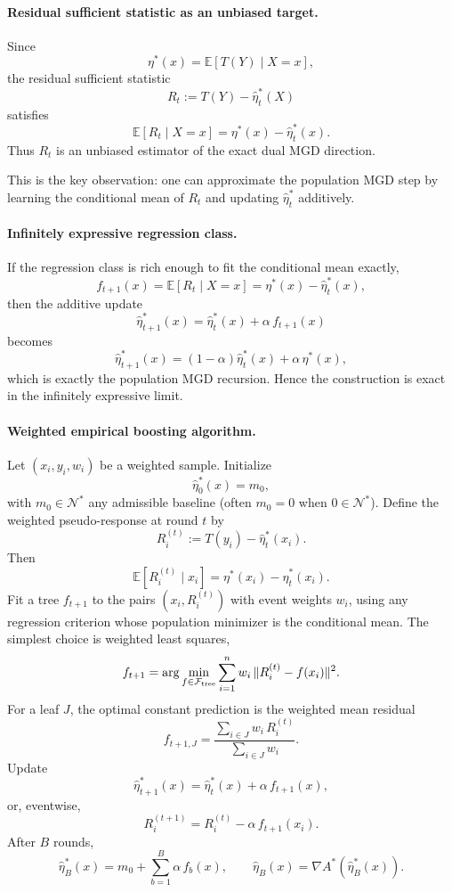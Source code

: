 \documentclass[11pt]{article}
\begin{document}
\paragraph{Residual sufficient statistic as an unbiased target.}
Since
\[
\eta^\ast(x)=\mathbb E[T(Y)\mid X=x],
\]
the residual sufficient statistic
\[
R_t:=T(Y)-\hat\eta_t^\ast(X)
\]
satisfies
\[
\mathbb E[R_t\mid X=x]
=
\eta^\ast(x)-\hat\eta_t^\ast(x).
\]
Thus \(R_t\) is an unbiased estimator of the exact dual MGD direction.

This is the key observation: one can approximate the population MGD step by learning the conditional mean of \(R_t\) and updating \(\hat\eta_t^\ast\) additively.

\paragraph{Infinitely expressive regression class.}
If the regression class is rich enough to fit the conditional mean exactly,
\[
f_{t+1}(x)=\mathbb E[R_t\mid X=x]
=\eta^\ast(x)-\hat\eta_t^\ast(x),
\]
then the additive update
\[
\hat\eta^\ast_{t+1}(x)=\hat\eta^\ast_t(x)+\alpha\,f_{t+1}(x)
\]
becomes
\[
\hat\eta^\ast_{t+1}(x)
=
(1-\alpha)\hat\eta^\ast_t(x)+\alpha\,\eta^\ast(x),
\]
which is exactly the population MGD recursion. Hence the construction is exact in the infinitely expressive limit.

\paragraph{Weighted empirical boosting algorithm.}
Let \((x_i,y_i,w_i)\) be a weighted sample. Initialize
\[
\hat\eta_0^\ast(x)=m_0,
\]
with \(m_0\in\mathcal N^\ast\) any admissible baseline (often \(m_0=0\) when \(0\in\mathcal N^\ast\)). Define the weighted pseudo-response at round \(t\) by
\[
R_i^{(t)}:=T(y_i)-\hat\eta_t^\ast(x_i).
\]
Then
\[
\mathbb E[R_i^{(t)}\mid x_i]
=
\eta^\ast(x_i)-\hat\eta_t^\ast(x_i).
\]
Fit a tree \(f_{t+1}\) to the pairs \((x_i,R_i^{(t)})\) with event weights \(w_i\), using any regression criterion whose population minimizer is the conditional mean. The simplest choice is weighted least squares,
\[
f_{t+1}
=
\arg\min_{f\in\mathcal F_{\rm tree}}
\sum_{i=1}^n w_i\,\|R_i^{(t)}-f(x_i)\|^2.
\]
For a leaf \(J\), the optimal constant prediction is the weighted mean residual
\[
f_{t+1,J}
=
\frac{\sum_{i\in J} w_i\,R_i^{(t)}}{\sum_{i\in J} w_i}.
\]
Update
\[
\hat\eta_{t+1}^\ast(x)=\hat\eta_t^\ast(x)+\alpha\,f_{t+1}(x),
\]
or, eventwise,
\[
R_i^{(t+1)}=R_i^{(t)}-\alpha\,f_{t+1}(x_i).
\]
After \(B\) rounds,
\[
\hat\eta_B^\ast(x)=m_0+\sum_{b=1}^B \alpha\,f_b(x),
\qquad
\hat\eta_B(x)=\nabla A^\ast(\hat\eta_B^\ast(x)).
\]
\end{document}
